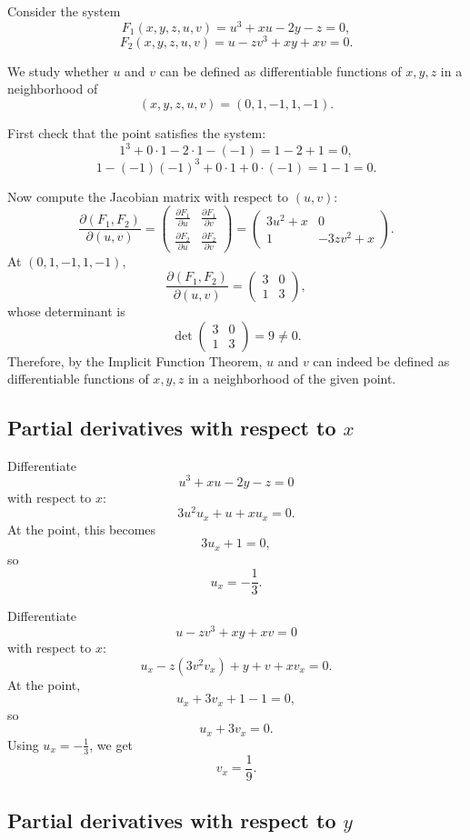 Consider the system
\[
F_1(x,y,z,u,v)=u^3+xu-2y-z=0,
\]
\[
F_2(x,y,z,u,v)=u-zv^3+xy+xv=0.
\]

We study whether \(u\) and \(v\) can be defined as differentiable functions of \(x,y,z\) in a neighborhood of
\[
(x,y,z,u,v)=(0,1,-1,1,-1).
\]

First check that the point satisfies the system:
\[
1^3+0\cdot 1-2\cdot 1-(-1)=1-2+1=0,
\]
\[
1-(-1)(-1)^3+0\cdot 1+0\cdot (-1)=1-1=0.
\]

Now compute the Jacobian matrix with respect to \((u,v)\):
\[
\frac{\partial(F_1,F_2)}{\partial(u,v)}
=
\begin{pmatrix}
\frac{\partial F_1}{\partial u} & \frac{\partial F_1}{\partial v}\\
\frac{\partial F_2}{\partial u} & \frac{\partial F_2}{\partial v}
\end{pmatrix}
=
\begin{pmatrix}
3u^2+x & 0\\
1 & -3zv^2+x
\end{pmatrix}.
\]
At \((0,1,-1,1,-1)\),
\[
\frac{\partial(F_1,F_2)}{\partial(u,v)}
=
\begin{pmatrix}
3 & 0\\
1 & 3
\end{pmatrix},
\]
whose determinant is
\[
\det
\begin{pmatrix}
3 & 0\\
1 & 3
\end{pmatrix}
=9\neq 0.
\]
Therefore, by the Implicit Function Theorem, \(u\) and \(v\) can indeed be defined as differentiable functions of \(x,y,z\) in a neighborhood of the given point.

\subsection*{Partial derivatives with respect to \(x\)}

Differentiate
\[
u^3+xu-2y-z=0
\]
with respect to \(x\):
\[
3u^2u_x+u+xu_x=0.
\]
At the point, this becomes
\[
3u_x+1=0,
\]
so
\[
u_x=-\frac13.
\]

Differentiate
\[
u-zv^3+xy+xv=0
\]
with respect to \(x\):
\[
u_x-z(3v^2v_x)+y+v+xv_x=0.
\]
At the point,
\[
u_x+3v_x+1-1=0,
\]
so
\[
u_x+3v_x=0.
\]
Using \(u_x=-\frac13\), we get
\[
v_x=\frac19.
\]

\subsection*{Partial derivatives with respect to \(y\)}

